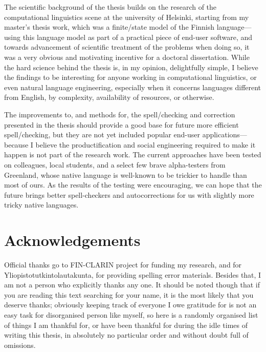 \documentclass[officiallayout]{unihelcompling}
\begin{document}
The scientific background of the thesis builds on the research of the
computational linguistics scene at the university of Helsinki, starting from my
master's thesis work, which was a finite\-/state model of the Finnish
language---using this language model as part of a practical piece of end-user
software, and towards advancement of scientific treatment of the problems
when doing so, it was a very obvious and motivating incentive for a doctoral
dissertation. While the hard science behind the thesis is, in my opinion,
delightfully simple, I believe the findings to be interesting for anyone
working in computational linguistics, or even natural language engineering,
especially when it concerns languages different from English, by complexity,
availability of resources, or otherwise.

The improvements to, and methods for, the spell\-/checking and correction
presented in the thesis should provide a good base for future more efficient
spell\-/checking, but they are not yet included popular end-user applications---
because I believe the productification and social engineering required to make
it happen is not part of the research work. The current approaches have been
tested on colleagues, local students, and a select few brave alpha-testers from
Greenland, whose native language is well-known to be trickier to handle than
most of ours. As the results of the testing were encouraging, we can hope that
the future brings better spell-checkers and autocorrections for us with
slightly more tricky native languages.

\section*{Acknowledgements}
\label{sec:acknowledgements}

Official thanks go to FIN-CLARIN project for funding my research, and for Yliopistotutkintolautakunta, for providing spelling error materials.
Besides that, I am not a person who explicitly thanks any one. It
should be noted though that if you are reading this text searching for your
name, it is the most likely that you deserve thanks; obviously keeping track of
everyone I owe gratitude for is not an easy task for disorganised person like
myself, so here is a randomly organised list of things I am thankful for, or
have been thankful for during the idle times of writing this thesis, in
absolutely no particular order and without doubt full of omissions.
\end{document}
